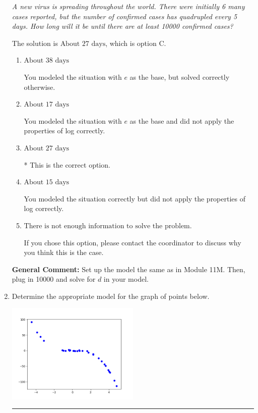 \documentclass{extbook}[14pt]
\newcommand{\litem}[1]{\item #1

\rule{\textwidth}{0.4pt}}
\begin{document}
\begin{enumerate}
{\begin{center}
    \textit{ A new virus is spreading throughout the world. There were initially 6 many cases reported, but the number of confirmed cases has quadrupled every 5 days. How long will it be until there are at least 10000 confirmed cases? }
\end{center}
The solution is \( \text{About } 27 \text{ days} \), which is option C.\begin{enumerate}[label=\Alph*.]
\item \( \text{About } 38 \text{ days} \)

You modeled the situation with $e$ as the base, but solved correctly otherwise.
\item \( \text{About } 17 \text{ days} \)

You modeled the situation with $e$ as the base and did not apply the properties of log correctly.
\item \( \text{About } 27 \text{ days} \)

* This is the correct option.
\item \( \text{About } 15 \text{ days} \)

You modeled the situation correctly but did not apply the properties of log correctly.
\item \( \text{There is not enough information to solve the problem.} \)

If you chose this option, please contact the coordinator to discuss why you think this is the case.
\end{enumerate}

\textbf{General Comment:} Set up the model the same as in Module 11M. Then, plug in 10000 and solve for $d$ in your model.
}
\litem{
Determine the appropriate model for the graph of points below.

\begin{center}
    \includegraphics[width=0.5\textwidth]{../Figures/identifyModelGraph12CopyC.png}
\end{center}


}
\end{enumerate}
\end{document}
